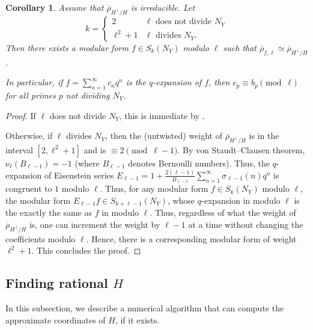 \documentclass{amsproc}
\numberwithin{equation}{section}
\newtheorem{corollary}[equation]{Corollary}
\theoremstyle{definition}
\theoremstyle{remark}
\newcommand{\rhoHperpH}{\overline\rho_{H^\perp\!/H}}
\begin{document}
\begin{corollary}
    \label{cor:modularity}
    Assume that $\rhoHperpH$ is irreducible. Let
    \begin{equation}
        \label{eq:weight_definition}
        k = \begin{cases}
            2 & \ell\text{ does not divide } N_Y \\
            \ell^2+1 & \ell \text{ divides } N_Y.
        \end{cases}
    \end{equation}
    Then there exists a modular form $f\in S_k(N_Y)$ modulo $\ell$ such that $\overline\rho_{f,\ell} \simeq \rhoHperpH$. 

    In particular, if $f = \sum_{n=1}^\infty c_n q^n$ is the $q$-expansion of $f$, then $c_p \equiv b_p\pmod\ell$ for all primes $p$ not dividing $N_Y$.
\end{corollary}
\begin{proof}
    If $\ell$ does not divide $N_Y$, this is immediate by .
    
    Otherwise, if $\ell$ divides $N_Y$, then the (untwisted) weight of $\rhoHperpH$ is in the interval $[2,\ell^2+1]$ and is $\equiv 2\pmod{\ell-1}$.
    By von Staudt–Clausen theorem,
    $\nu_\ell(B_{\ell-1}) = -1$ (where $B_{\ell-1}$
    denotes Bernoulli numbers). Thus, the $q$-expansion of Eisenstein series $E_{\ell-1} = 1 + \frac{2(\ell-1)}{B_{\ell-1}}\sum_{n=1}^\infty \sigma_{\ell-1}(n)q^n$ 
    is congruent to $1$ modulo $\ell$.
    Thus, for any modular form $f\in S_k(N_Y)$ modulo $\ell$, the modular form $E_{\ell-1} f \in S_{k+\ell-1}(N_Y)$, whose $q$-expansion in modulo $\ell$ is the exactly the same as $f$ in modulo $\ell$.
    Thus, regardless of what the weight of $\rhoHperpH$ is, one can increment the weight by $\ell-1$ at a time without changing the coefficients modulo $\ell$.
    Hence, there is a corresponding modular form of weight $\ell^2+1$. This concludes the proof.
\end{proof}

\subsection{Finding rational \texorpdfstring{$H$}{H}}
\label{subsec:proving_H}
In this subsection, we describe a numerical algorithm that can compute the approximate coordinates of $H$, if it exists.
\end{document}
